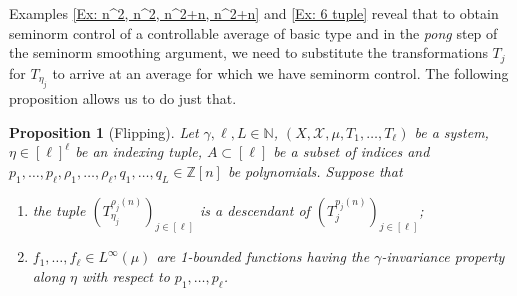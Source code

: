 \documentclass[11pt]{amsart}
\newtheorem{proposition}[lemma]{Proposition}
\theoremstyle{definition}
\newcommand{\N}{{\mathbb N}}
\newcommand{\Z}{{\mathbb Z}}
\newcommand{\CX}{{\mathcal X}}
\newcommand{\FI}{{\mathfrak I}}
\newcommand{\FL}{{\mathfrak L}}
\newcommand{\brac}[1]{\mathopen{}\left( #1 \mathclose{}\right)}
\begin{document}
Examples \ref{Ex: n^2, n^2, n^2+n, n^2+n} and \ref{Ex: 6 tuple} reveal that to obtain seminorm control of a controllable average of basic type and in the \textit{pong} step of the seminorm smoothing argument, we need to substitute the transformations $T_j$ for $T_{\eta_j}$ to arrive at an average for which we have seminorm control. The following proposition allows us to do just that.
\begin{proposition}[Flipping]\label{P:flipping}
Let $\gamma, \ell, L\in\N$, $(X, \CX, \mu, T_1, \ldots, T_\ell)$ be a system, $\eta\in[\ell]^\ell$ be an indexing tuple, $A\subset[\ell]$ be a subset of indices and $p_1, \ldots, p_\ell, \rho_1, \ldots, \rho_\ell, q_1, \ldots, q_L\in\Z[n]$ be polynomials. Suppose that
\begin{enumerate}
    \item the tuple $\brac{T_{\eta_j}^{\rho_j(n)}}_{j\in[\ell]}$ is a descendant of $\brac{T_j^{p_j(n)}}_{j\in[\ell]}$;
    \item $f_1, \ldots, f_{\ell}\in L^\infty(\mu)$ are 1-bounded functions having the $\gamma$-invariance property along $\eta$ with respect to $p_1, \ldots, p_\ell$.
\end{enumerate}


\end{proposition}
\end{document}
